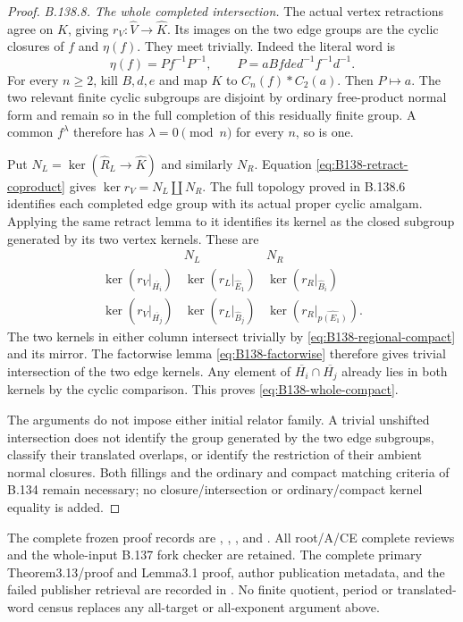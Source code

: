 \begin{proof}
\emph{B.138.8. The whole completed intersection.}
The actual vertex retractions agree on $K$, giving
$r_V:\widehat V\to\widehat K$. Its images on the two edge groups
are the cyclic closures of $f$ and $\eta(f)$. They meet trivially.
Indeed the literal word is
\[
\eta(f)=P f^{-1}P^{-1},\qquad
P=aBfde d^{-1}f^{-1}d^{-1}.
\]
For every $n\ge2$, kill $B,d,e$ and map $K$ to $C_n(f)*C_2(a)$.
Then $P\mapsto a$. The two relevant finite cyclic subgroups are
disjoint by ordinary free-product normal form and remain so in the
full completion of this residually finite group. A common $f^\lambda$
therefore has $\lambda=0\pmod n$ for every $n$, so is one.

Put $N_L=\ker(\widehat R_L\to\widehat K)$ and similarly $N_R$.
Equation \eqref{eq:B138-retract-coproduct} gives
$\ker r_V=N_L\amalg N_R$. The full topology proved in B.138.6
identifies each completed edge group with its actual proper cyclic
amalgam. Applying the same retract lemma to it identifies its kernel
as the closed subgroup generated by its two vertex kernels. These are
\[
\begin{array}{c|cc}
 &N_L&N_R\\ \hline
\ker(r_V|_{\overline{H_i}})&
 \ker(r_L|_{\widehat E_1})&\ker(r_R|_{\widehat B_i})\\
\ker(r_V|_{\overline{H_j}})&
 \ker(r_L|_{\widehat B_j})&\ker(r_R|_{\widehat{p(E_1)}}).
\end{array}
\]
The two kernels in either column intersect trivially by
\eqref{eq:B138-regional-compact} and its mirror. The factorwise lemma
\eqref{eq:B138-factorwise} therefore gives trivial intersection of
the two edge kernels. Any element of $\overline{H_i}\cap\overline{H_j}$
already lies in both kernels by the cyclic comparison. This proves
\eqref{eq:B138-whole-compact}.

The arguments do not impose either initial relator family. A trivial
unshifted intersection does not identify the group generated by the
two edge subgroups, classify their translated overlaps, or identify
the restriction of their ambient normal closures. Both fillings and
the ordinary and compact matching criteria of B.134 remain necessary;
no closure/intersection or ordinary/compact kernel equality is added.
\end{proof}

\begingroup\raggedright\footnotesize
The complete frozen proof records are
,
,
,
and .
All root/A/CE complete reviews and the whole-input B.137 fork checker
are retained. The complete primary Theorem3.13/proof and Lemma3.1
proof, author publication metadata, and the failed publisher retrieval
are recorded in
.
No finite quotient, period or translated-word census replaces any
all-target or all-exponent argument above.
\par\endgroup

